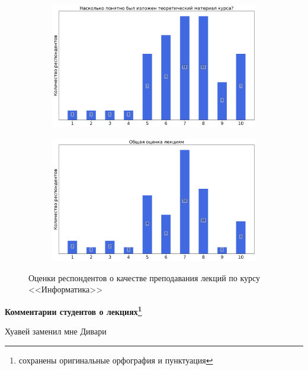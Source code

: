 \begin{figure}[H]
\begin{subfigure}[b]{0.45\textwidth}
			\end{subfigure}
			\begin{subfigure}[b]{0.45\textwidth}
				\centering
				\includegraphics[width=\textwidth]{images/1 course/Информатика/lecturer-marks-Дивари И.Н.-2.png}
			\end{subfigure}
			\begin{subfigure}[b]{0.45\textwidth}
				\centering
				\includegraphics[width=\textwidth]{images/1 course/Информатика/lecturer-marks-Дивари И.Н.-3.png}
			\end{subfigure}
			\caption{Оценки респондентов о качестве преподавания лекций по курсу <<Информатика>>}
		\end{figure}

		\textbf{Комментарии студентов о лекциях\protect\footnote{сохранены оригинальные орфография и пунктуация}}    
            \begin{commentbox} 
                Хуавей заменил мне Дивари 
            \end{commentbox} 
        
